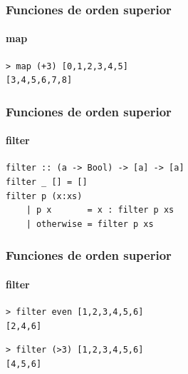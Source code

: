 \documentclass{beamer}
\begin{document}
\begin{frame}[fragile]
  \frametitle{Funciones de orden superior}
  \framesubtitle{map}

\begin{lstlisting}[numbers=none, backgroundcolor=\color{lightgray}, keywordstyle=\color{black}]
> map (+3) [0,1,2,3,4,5]
[3,4,5,6,7,8]
\end{lstlisting}


\end{frame}


\begin{frame}[fragile]
  \frametitle{Funciones de orden superior}
  \framesubtitle{filter}

\begin{lstlisting}
filter :: (a -> Bool) -> [a] -> [a]
filter _ [] = []
filter p (x:xs)
    | p x       = x : filter p xs
    | otherwise = filter p xs
\end{lstlisting}

\end{frame}


\begin{frame}[fragile]
  \frametitle{Funciones de orden superior}
  \framesubtitle{filter}


\begin{lstlisting}[numbers=none, backgroundcolor=\color{lightgray}, keywordstyle=\color{black}]
> filter even [1,2,3,4,5,6]
[2,4,6]
\end{lstlisting}

\vspace{0.3cm}

\begin{lstlisting}[numbers=none, backgroundcolor=\color{lightgray}, keywordstyle=\color{black}]
> filter (>3) [1,2,3,4,5,6]
[4,5,6]
\end{lstlisting}

\end{frame}
\end{document}
